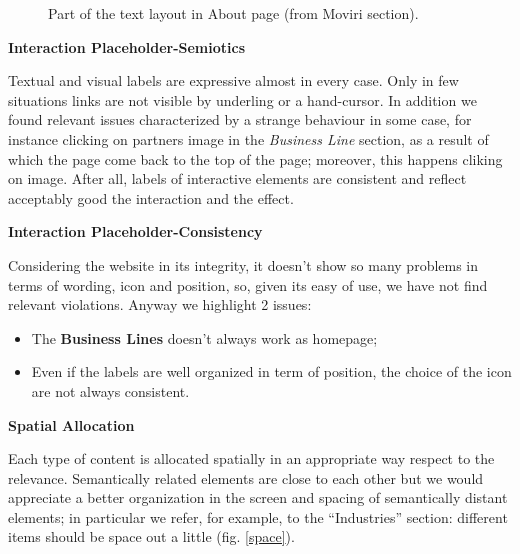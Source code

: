 \begin{figure}[H]
  \centering
  \caption{Part of the text layout in About page (from Moviri section).}
   \label{text}
\end{figure}


\textbf{Interaction Placeholder-Semiotics}\par
Textual and visual labels are expressive almost in every case. Only in few situations links are not visible by underling or a hand-cursor. In addition we found relevant issues characterized by a strange behaviour in some case, for instance clicking on partners image in the \textit{Business Line} section, as a result of which the page come back to the top of the page; moreover, this happens cliking on image. After all, labels of interactive elements are consistent and reflect acceptably good the interaction and the effect.\\

\medskip

\textbf{Interaction Placeholder-Consistency}\par
Considering the website in its integrity, it doesn’t show so many problems in terms of wording, icon and position, so, given its easy of use, we have not find relevant violations. 
Anyway we highlight 2 issues:
\begin{itemize}
\item The \textbf{Business Lines} doesn’t always work as homepage;
\item Even if the labels are well organized in term of position, the choice of the icon are not always consistent.
\end{itemize}
\medskip

\textbf{Spatial Allocation}\par
Each type of content is allocated spatially in an appropriate way respect to the relevance. Semantically related elements are close to each other but we would appreciate a better organization in the screen and spacing of semantically distant elements; in particular we refer, for example, to the “Industries” section: different items should be space out a little (fig. \ref{space}). 

